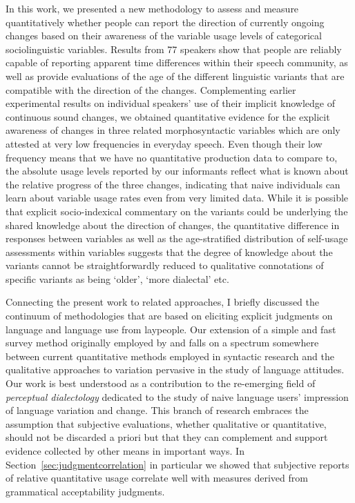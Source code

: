 In this work, we presented a new methodology to assess and measure quantitatively whether people can report the direction of currently ongoing changes based on their awareness of the variable usage levels of categorical sociolinguistic variables.
Results from 77 speakers show that people are reliably capable of reporting
apparent time differences within their speech community, as well as provide evaluations of the age of the different linguistic variants that are compatible with the direction of the changes.
Complementing earlier experimental results on individual speakers' use of their implicit knowledge of continuous sound changes, we obtained quantitative evidence for the explicit awareness of changes in three related morphosyntactic variables which are only attested at very low frequencies in everyday speech.
Even though their low frequency means that we have no quantitative production data to compare to, the absolute usage levels reported by our informants reflect what is known about the relative progress of the three changes, indicating that naive individuals can learn about variable usage rates even from very limited data.
While it is possible that explicit socio-indexical commentary on the variants could be underlying the shared knowledge about the direction of changes, the quantitative difference in responses between variables as well as the age-stratified distribution of self-usage assessments within variables
suggests that the degree of knowledge about the variants cannot be straightforwardly reduced to qualitative connotations of specific variants as being `older', `more dialectal' etc.

Connecting the present work to related approaches, I briefly discussed the continuum of methodologies that are based on eliciting explicit judgments on language and language use from laypeople.
Our extension of a simple and fast survey method originally employed by \citet{Labov1966} and \citet{Trudgill1972} falls on a spectrum somewhere between current quantitative methods employed in syntactic research and the qualitative approaches to variation pervasive in the study of language attitudes. Our work is best understood as a contribution to the re-emerging field of \emph{perceptual dialectology} dedicated to the study of naive language users' impression of language variation and change. This branch of research embraces the assumption that subjective evaluations, whether qualitative or quantitative, should not be discarded a priori but that they can complement and support evidence collected by other means in important ways.
In Section~\ref{sec:judgmentcorrelation} in particular we showed that subjective reports of relative quantitative usage correlate well with measures derived from grammatical acceptability judgments.

